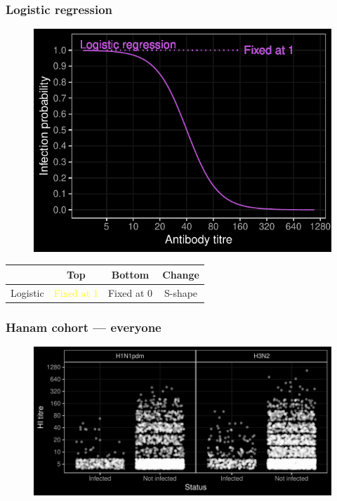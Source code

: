 \documentclass{beamer}
\begin{document}
\begin{frame}
\frametitle{Logistic regression}

	\begin{figure}
		\includegraphics[scale = 0.75]{../curve-models/curve_2_dark.pdf}%
	\end{figure}

	\begin{table}
	\begin{tabular}{l | ccc}
		 & Top & Bottom & Change \\
		\hline
		Logistic & \textcolor{yellow}{Fixed at 1} & Fixed at 0 & S-shape
	\end{tabular}
	\end{table}

\end{frame}

\begin{frame}
\frametitle{Hanam cohort --- everyone}

	\begin{figure}
		\includegraphics[scale = 0.7]{../data-plot/hanam_scatter_general_dark.pdf}%
	\end{figure}

\end{frame}
\end{document}
